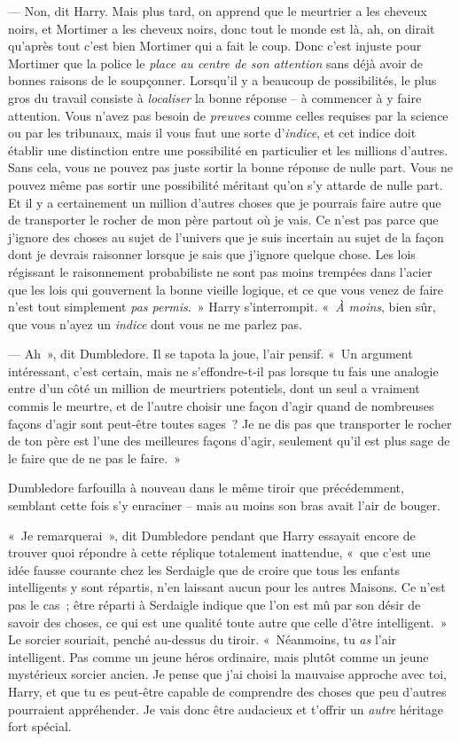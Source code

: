 --- Non, dit Harry. Mais plus tard, on apprend que le meurtrier a les cheveux noirs, et Mortimer a les cheveux noirs, donc tout le monde est là, ah, on dirait qu'après tout c'est bien Mortimer qui a fait le coup. Donc c'est injuste pour Mortimer que la police le \emph{place au centre de son attention} sans déjà avoir de bonnes raisons de le soupçonner. Lorsqu'il y a beaucoup de possibilités, le plus gros du travail consiste à \emph{localiser} la bonne réponse -- à commencer à y faire attention. Vous n'avez pas besoin de \emph{preuves} comme celles requises par la science ou par les tribunaux, mais il vous faut une sorte d'\emph{indice}, et cet indice doit établir une distinction entre une possibilité en particulier et les millions d'autres. Sans cela, vous ne pouvez pas juste sortir la bonne réponse de nulle part. Vous ne pouvez même pas sortir une possibilité méritant qu'on s'y attarde de nulle part. Et il y a certainement un million d'autres choses que je pourrais faire autre que de transporter le rocher de mon père partout où je vais. Ce n'est pas parce que j'ignore des choses au sujet de l'univers que je suis incertain au sujet de la façon dont je devrais raisonner lorsque je sais que j'ignore quelque chose. Les lois régissant le raisonnement probabiliste ne sont pas moins trempées dans l'acier que les lois qui gouvernent la bonne vieille logique, et ce que vous venez de faire n'est tout simplement \emph{pas permis}.~» Harry s'interrompit. «~\emph{À moins}, bien sûr, que vous n'ayez un \emph{indice} dont vous ne me parlez pas.

--- Ah~», dit Dumbledore. Il se tapota la joue, l'air pensif. «~Un argument intéressant, c'est certain, mais ne s'effondre-t-il pas lorsque tu fais une analogie entre d'un côté un million de meurtriers potentiels, dont un seul a vraiment commis le meurtre, et de l'autre choisir une façon d'agir quand de nombreuses façons d'agir sont peut-être toutes sages~? Je ne dis pas que transporter le rocher de ton père est l'une des meilleures façons d'agir, seulement qu'il est plus sage de le faire que de ne pas le faire.~»

Dumbledore farfouilla à nouveau dans le même tiroir que précédemment, semblant cette fois s'y enraciner -- mais au moins son bras avait l'air de bouger.

«~Je remarquerai~», dit Dumbledore pendant que Harry essayait encore de trouver quoi répondre à cette réplique totalement inattendue, «~que c'est une idée fausse courante chez les Serdaigle que de croire que tous les enfants intelligents y sont répartis, n'en laissant aucun pour les autres Maisons. Ce n'est pas le cas~; être réparti à Serdaigle indique que l'on est mû par son désir de savoir des choses, ce qui est une qualité toute autre que celle d'être intelligent.~» Le sorcier souriait, penché au-dessus du tiroir. «~Néanmoins, tu \emph{as} l'air intelligent. Pas comme un jeune héros ordinaire, mais plutôt comme un jeune mystérieux sorcier ancien. Je pense que j'ai choisi la mauvaise approche avec toi, Harry, et que tu es peut-être capable de comprendre des choses que peu d'autres pourraient appréhender. Je vais donc être audacieux et t'offrir un \emph{autre} héritage fort spécial.

